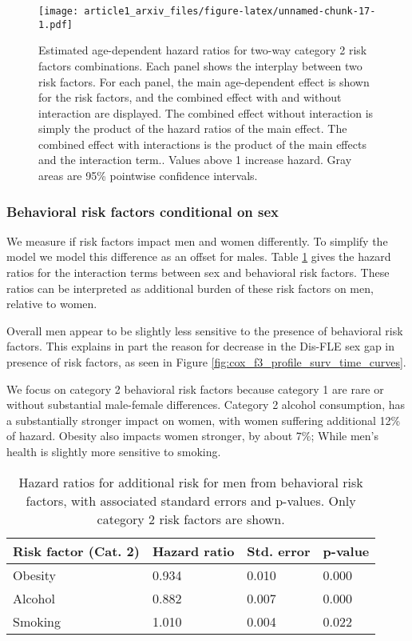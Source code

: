 \documentclass{article}
\begin{document}
\begin{figure}
\centering
\texttt{[image: article1\_arxiv\_files/figure-latex/unnamed-chunk-17-1.pdf]}
\caption{\label{fig:cox-f1-tt1-effects-fdr-inter} Estimated
age-dependent hazard ratios for two-way category 2 risk factors
combinations. Each panel shows the interplay between two risk factors.
For each panel, the main age-dependent effect is shown for the risk
factors, and the combined effect with and without interaction are
displayed. The combined effect without interaction is simply the product
of the hazard ratios of the main effect. The combined effect with
interactions is the product of the main effects and the interaction
term.. Values above 1 increase hazard. Gray areas are 95\% pointwise
confidence intervals.}
\end{figure}

\hypertarget{behavioral-risk-factors-conditional-on-sex}{%
\subsubsection{Behavioral risk factors conditional on
sex}\label{behavioral-risk-factors-conditional-on-sex}}

We measure if risk factors impact men and women differently. To simplify
the model we model this difference as an offset for males. Table
\ref{tab:cox-f3-coefs-fdr-inter} gives the hazard ratios for the
interaction terms between sex and behavioral risk factors. These ratios
can be interpreted as additional burden of these risk factors on men,
relative to women.

Overall men appear to be slightly less sensitive to the presence of
behavioral risk factors. This explains in part the reason for decrease
in the Dis-FLE sex gap in presence of risk factors, as seen in Figure
\ref{fig:cox_f3_profile_surv_time_curves}.

We focus on category 2 behavioral risk factors because category 1 are
rare or without substantial male-female differences. Category 2 alcohol
consumption, has a substantially stronger impact on women, with women
suffering additional 12\% of hazard. Obesity also impacts women
stronger, by about 7\%; While men's health is slightly more sensitive to
smoking.

\begin{table}

\caption{\label{tab:cox-f3-coefs-fdr-inter}
            Hazard ratios for additional risk for men from behavioral
            risk factors, with associated standard errors and p-values.
            Only category 2 risk factors are shown.
            }
\centering
\begin{tabular}[t]{llll}
\toprule
Risk factor (Cat. 2) & Hazard ratio & Std. error & p-value\\
\midrule
Obesity & 0.934 & 0.010 & 0.000\\
Alcohol & 0.882 & 0.007 & 0.000\\
Smoking & 1.010 & 0.004 & 0.022\\
\bottomrule
\end{tabular}
\end{table}
\end{document}
